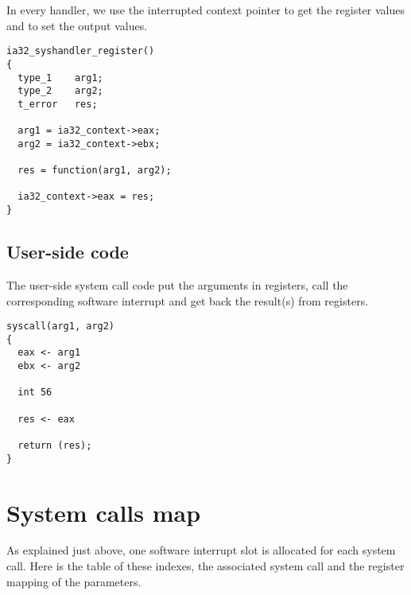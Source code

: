 In every handler, we use the interrupted context pointer to get the
register values and to set the output values.

\begin{verbatim}
ia32_syshandler_register()
{
  type_1    arg1;
  type_2    arg2;
  t_error   res;

  arg1 = ia32_context->eax;
  arg2 = ia32_context->ebx;

  res = function(arg1, arg2);

  ia32_context->eax = res;
}
\end{verbatim}

%
%

\subsection{User-side code}

The user-side system call code put the arguments in registers, call
the corresponding software interrupt and get back the result(s) from
registers.

\begin{verbatim}
syscall(arg1, arg2)
{
  eax <- arg1
  ebx <- arg2

  int 56

  res <- eax

  return (res);
}
\end{verbatim}

%
%

\section{System calls map}

As explained just above, one software interrupt slot is allocated for
each system call. Here is the table of these indexes, the associated
system call and the register mapping of the parameters.

